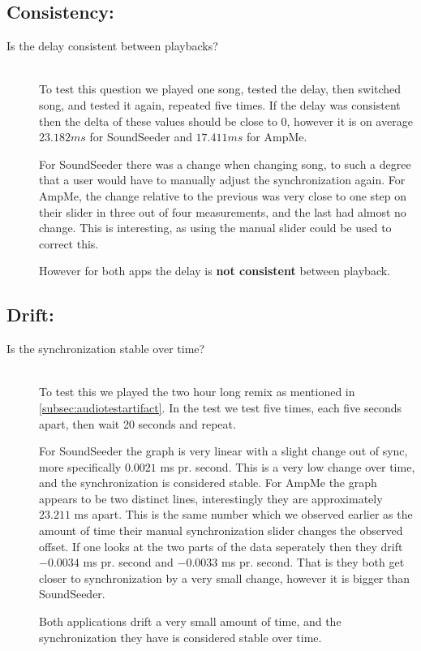 \subsection*{Consistency:}
\begin{description}
    \item[Is the delay consistent between playbacks?] \hfill \\
    To test this question we played one song, tested the delay, then switched song, and tested it again, repeated five times.
    If the delay was consistent then the delta of these values should be close to $0$, however it is on average $23.182 ms$ for SoundSeeder and $17.411 ms$ for AmpMe.

    For SoundSeeder there was a change when changing song, to such a degree that a user would have to manually adjust the synchronization again.
    For AmpMe, the change relative to the previous was very close to one step on their slider in three out of four measurements, and the last had almost no change.
    This is interesting, as using the manual slider could be used to correct this.

    However for both apps the delay is \textbf{not consistent} between playback.
\end{description}

\subsection*{Drift:}
\begin{description}
    \item[Is the synchronization stable over time?] \hfill \\
    To test this we played the two hour long remix as mentioned in \vref{subsec:audiotestartifact}.
    In the test we test five times, each five seconds apart, then wait 20 seconds and repeat.

    For SoundSeeder the graph is very linear with a slight change out of sync, more specifically $0.0021$ ms pr. second.
    This is a very low change over time, and the synchronization is considered stable.
    For AmpMe the graph appears to be two distinct lines, interestingly they are approximately $23.211$ ms apart.
    This is the same number which we observed earlier as the amount of time their manual synchronization slider changes the observed offset.
    If one looks at the two parts of the data seperately then they drift $-0.0034$ ms pr. second and $-0.0033$ ms pr. second.
    That is they both get closer to synchronization by a very small change, however it is bigger than SoundSeeder.

    Both applications drift a very small amount of time, and the synchronization they have is considered stable over time.
\end{description}

